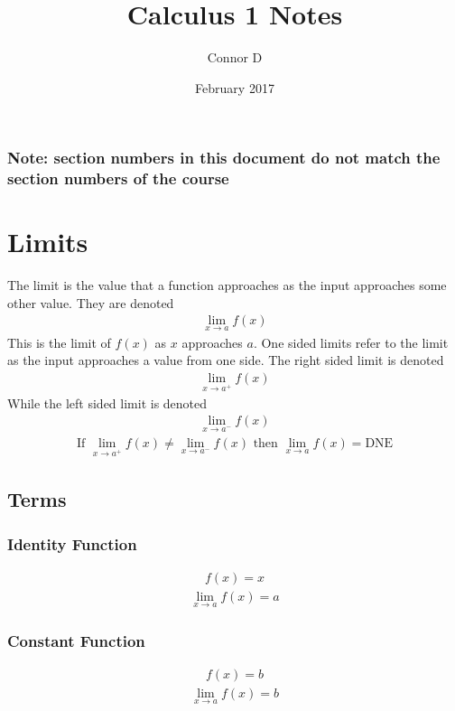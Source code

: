 \documentclass{article}
\title{Calculus 1 Notes}
\author{Connor D}
\date{February 2017}
\newcommand\limxa{\lim_{x\to a}}
\newcommand\limxar{\lim_{x\to a^+}}
\newcommand\limxal{\lim_{x\to a^-}}
\begin{document}
\maketitle

\subsubsection*{Note: section numbers in this document do not match the section numbers of the course}

\section{Limits}
    The limit is the value that a function approaches as the input approaches some other value. They are denoted
    \begin{gather*}
        \limxa f(x)
    \end{gather*}
    This is the limit of \(f(x)\) as \(x\) approaches \(a\). One sided limits refer to the limit as the input approaches a value from one side. The right sided limit is denoted
    \begin{gather*}
        \limxar f(x)
    \end{gather*}
    While the left sided limit is denoted
    \begin{gather*}
        \limxal f(x)
    \end{gather*}
    \begin{gather*}
        \text{If } \limxar f(x)\neq\limxal f(x) \text{ then } \limxa f(x) = \text{DNE}
    \end{gather*}
    \subsection{Terms}
        \subsubsection{Identity Function}
            \begin{gather*}
                f(x)=x
            \end{gather*}
            \begin{gather*}
                \limxa f(x) = a
            \end{gather*}

        \subsubsection{Constant Function}
            \begin{gather*}
                f(x)=b
            \end{gather*}
            \begin{gather*}
                \limxa f(x) = b
            \end{gather*}
\end{document}
